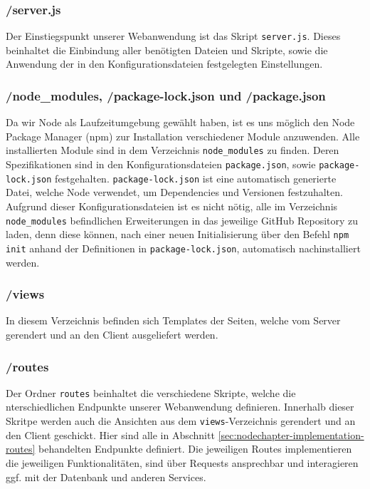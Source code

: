 \subsubsection*{/server.js}
Der Einstiegspunkt unserer Webanwendung ist das Skript \verb|server.js|. Dieses beinhaltet die Einbindung aller benötigten Dateien und Skripte, sowie die Anwendung der in den Konfigurationsdateien festgelegten Einstellungen.

\subsubsection*{/node\_modules, /package-lock.json und /package.json}
Da wir Node als Laufzeitumgebung gewählt haben, ist es uns möglich den Node Package Manager (npm) zur Installation verschiedener Module anzuwenden. Alle installierten Module sind in dem Verzeichnis \verb|node_modules| zu finden. Deren Spezifikationen sind in den Konfigurationsdateien \verb|package.json|, sowie \verb|package-lock.json| festgehalten. \verb|package-lock.json| ist eine automatisch generierte Datei, welche Node verwendet, um Dependencies und Versionen festzuhalten. Aufgrund dieser Konfigurationsdateien ist es nicht nötig, alle im Verzeichnis \verb|node_modules| befindlichen Erweiterungen in das jeweilige GitHub Repository zu laden, denn diese können, nach einer neuen Initialisierung über den Befehl \verb|npm init| anhand der Definitionen in \verb|package-lock.json|, automatisch nachinstalliert werden.

\subsubsection*{/views}
In diesem Verzeichnis befinden sich Templates der Seiten, welche vom Server gerendert und an den Client ausgeliefert werden.

\subsubsection*{/routes}
Der Ordner \verb|routes| beinhaltet die verschiedene Skripte, welche die  nterschiedlichen Endpunkte unserer Webanwendung definieren. Innerhalb dieser Skritpe werden auch die Ansichten aus dem \verb|views|-Verzeichnis gerendert und an den Client geschickt. Hier sind alle in Abschnitt \ref{sec:nodechapter-implementation-routes} behandelten Endpunkte definiert. Die jeweiligen Routes implementieren die jeweiligen Funktionalitäten, sind über Requests ansprechbar und interagieren ggf. mit der Datenbank und anderen Services.

